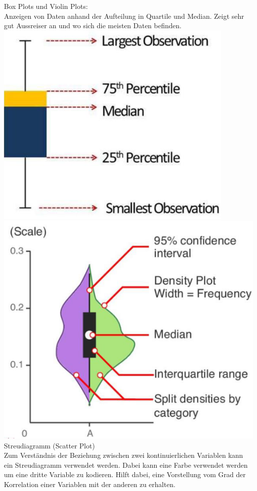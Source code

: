 \textcolor{myblue}{Box Plots und Violin Plots:}\\
Anzeigen von Daten anhand der Aufteilung in Quartile und Median. Zeigt sehr gut Aussreiser an und wo sich die meisten Daten befinden.
\includegraphics[width=\linewidth]{img/boxplot.png}
\includegraphics[width=\linewidth]{img/violinplot.png}
\textcolor{myblue}{Streudiagramm (Scatter Plot)}\\
Zum Verständnis der Beziehung zwischen zwei kontinuierlichen Variablen kann ein Streudiagramm verwendet werden. Dabei kann eine Farbe verwendet werden um eine dritte Variable zu kodieren. Hilft dabei, eine Vorstellung vom Grad der Korrelation einer Variablen mit der anderen zu erhalten.
